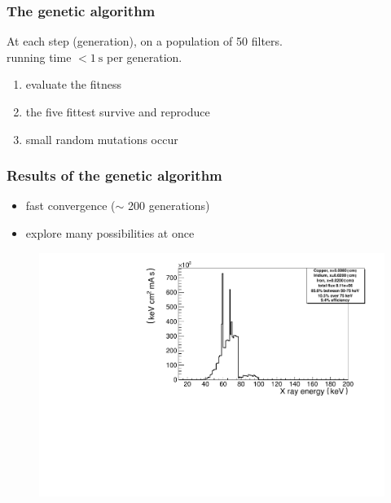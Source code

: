 \documentclass[first,firstsupp]{ETHclass}
\begin{document}
    \begin{frame}
        \frametitle{The genetic algorithm}
        At each step (generation), on a population of 50 filters.\\
        running time $< \SI{1}{\second}$ per generation.
        \vspace{\baselineskip}\\
        \begin{enumerate}
            \item evaluate the fitness 
            \item the five \alert{fittest survive} and reproduce
            \item small random \alert{mutations} occur 
        \end{enumerate}
    \end{frame}

    \begin{frame}
        \frametitle{Results of the genetic algorithm}
        \begin{itemize}
            \item fast convergence ($\sim$ 200 generations)
            \item explore many possibilities at once
        \end{itemize}
        \begin{figure}[h]
            \centering
            \includegraphics[width=.7\textwidth]{filtered} 
        \end{figure}
    \end{frame}
\end{document}
